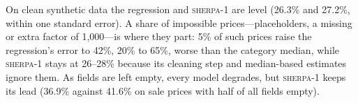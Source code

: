 On clean synthetic data the regression and \textsc{sherpa-1} are level (26.3\% and 27.2\%, within
one standard error). A share of impossible prices---placeholders, a missing or extra factor of
1{,}000---is where they part: 5\% of such prices raise the regression's error to 42\%, 20\% to
65\%, worse than the category median, while \textsc{sherpa-1} stays at 26--28\% because its cleaning
step and median-based estimates ignore them. As fields are left empty, every model degrades, but
\textsc{sherpa-1} keeps its lead (36.9\% against 41.6\% on sale prices with half of all fields
empty).
